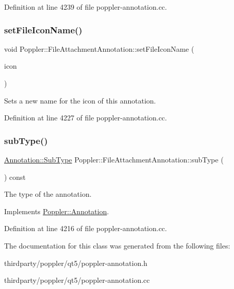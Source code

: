 Definition at line 4239 of file poppler-\/annotation.\+cc.

\mbox{\label{class_poppler_1_1_file_attachment_annotation_a09f0977d356503ab7e92bdf7fbf5d53e}} 
\subsubsection{\texorpdfstring{set\+File\+Icon\+Name()}{setFileIconName()}}
{\footnotesize\ttfamily void Poppler\+::\+File\+Attachment\+Annotation\+::set\+File\+Icon\+Name (\begin{DoxyParamCaption}\item[{const Q\+String \&}]{icon }\end{DoxyParamCaption})}

Sets a new name for the icon of this annotation. 

Definition at line 4227 of file poppler-\/annotation.\+cc.

\mbox{\label{class_poppler_1_1_file_attachment_annotation_a7c3d7b8924142ece38d3909af0cf1425}} 
\subsubsection{\texorpdfstring{sub\+Type()}{subType()}}
{\footnotesize\ttfamily \hyperlink{class_poppler_1_1_annotation_a2d592999c330949d64679cfa9e81113f}{Annotation\+::\+Sub\+Type} Poppler\+::\+File\+Attachment\+Annotation\+::sub\+Type (\begin{DoxyParamCaption}{ }\end{DoxyParamCaption}) const\hspace{0.3cm}{\ttfamily [virtual]}}

The type of the annotation. 

Implements \hyperlink{class_poppler_1_1_annotation_aef7fa1532193b41fbeba6e577579d984}{Poppler\+::\+Annotation}.



Definition at line 4216 of file poppler-\/annotation.\+cc.



The documentation for this class was generated from the following files\+:\begin{DoxyCompactItemize}
\item 
thirdparty/poppler/qt5/poppler-\/annotation.\+h\item 
thirdparty/poppler/qt5/poppler-\/annotation.\+cc\end{DoxyCompactItemize}
